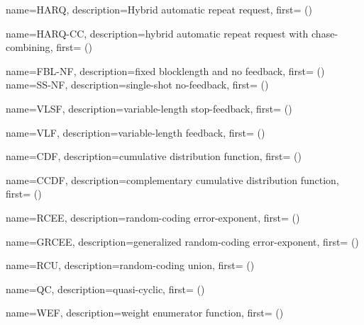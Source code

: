 {
  name={HARQ},
  description={Hybrid automatic repeat request},
  first={ ()}
}

{
  name={HARQ-CC},
  description={hybrid automatic repeat request with chase-combining},
  first={ ()}
}

{
  name={FBL-NF},
  description={fixed blocklength and no feedback},
  first={ ()}
}
{
  name={SS-NF},
  description={single-shot no-feedback},
  first={ ()}
}



{
  name={VLSF},
  description={variable-length stop-feedback},
  first={ ()}
}

{
  name={VLF},
  description={variable-length feedback},
  first={ ()}
}

{
  name={CDF},
  description={cumulative distribution function},
  first={ ()}
}

{
  name={CCDF},
  description={complementary cumulative distribution function},
  first={ ()}
}

{
  name={RCEE},
  description={random-coding error-exponent},
  first={ ()}
}


{
  name={GRCEE},
  description={generalized random-coding error-exponent},
  first={ ()}
}

{
  name={RCU},
  description={random-coding union},
  first={ ()}
}

{
  name={QC},
  description={quasi-cyclic},
  first={ ()}
}

{
  name={WEF},
  description={weight enumerator function},
  first={ ()}
}

